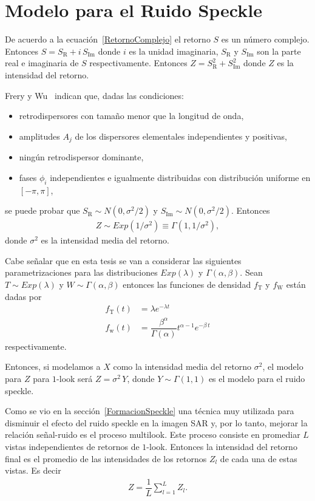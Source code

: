 \section{Modelo para el Ruido Speckle}
\label{ModeloSpeckle}

De acuerdo a la ecuación~\eqref{RetornoComplejo} el retorno $S$ es un número complejo. Entonces $S=S_{\text{R}}+i \, S_{\text{Im}}$ donde $i$ es la unidad imaginaria, $S_{\text{R}}$ y $S_{\text{Im}}$ son la parte real e imaginaria de $S$ respectivamente. Entonces $Z=S_{\text{R}}^2+S_{\text{Im}}^2$ donde $Z$ es la intensidad del retorno. 

Frery y Wu~\cite{FreryLibro2019} indican que, dadas las condiciones:
\begin{itemize}
	\item retrodispersores con tamaño menor que la longitud de onda,
	\item amplitudes $A_j$ de los dispersores elementales independientes y positivas,
	\item ningún retrodispersor dominante, 
	\item fases $\phi_i$ independientes e igualmente distribuidas con distribución uniforme en $[-\pi,\pi]$,
\end{itemize}   
se puede probar que $S_{\text{R}} \sim N(0,\sigma^2/2)$ y $S_{\text{Im}} \sim N(0,\sigma^2/2)$. Entonces
\begin{align}
\label{DistRetornoExp}
	Z \sim Exp(1/\sigma^2) \equiv \Gamma(1,1/\sigma^2),
\end{align}
donde $\sigma^2$ es la intensidad media del retorno.

Cabe señalar que en esta tesis se van a considerar las siguientes parametrizaciones para las distribuciones $Exp(\lambda)$ y $\Gamma(\alpha,\beta)$. Sean $T \sim Exp(\lambda)$ y $W \sim \Gamma(\alpha,\beta)$ entonces las funciones de densidad $f_{\text{T}}$ y $f_{\text{W}}$ están dadas por
\begin{align}
f_{\text{T}}(t)&=\lambda e^{-\lambda t}\label{DistExponencial}\\
f_{\text{w}}(t)&=\dfrac{\beta^{\alpha}}{\Gamma(\alpha)} t^{\alpha-1} e^{-\beta \, t}\label{DistGamma}
\end{align}
respectivamente.  

Entonces, si modelamos a $X$ como la intensidad media del retorno $\sigma^2$, el modelo para $Z$ para $1$-look será $Z=\sigma^2 \, Y$, donde $Y \sim \Gamma(1,1)$ es el modelo para el ruido speckle.
 
Como se vio en la sección~\ref{FormacionSpeckle} una técnica muy utilizada para disminuir el efecto del ruido speckle en la imagen SAR y, por lo tanto, mejorar la relación señal-ruido es el proceso multilook. Este proceso consiste en promediar $L$ vistas independientes de retornos de $1$-look. Entonces la intensidad del retorno final es el promedio de las intensidades de los retornos $Z_l$ de cada una de estas vistas. Es decir 
\begin{align}
Z=\dfrac{1}{L}\sum_{l=1}^L Z_l.
\end{align}

